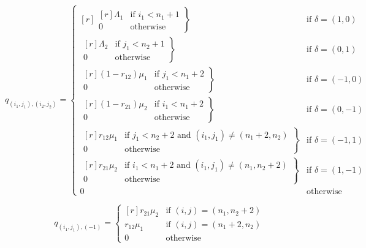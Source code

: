 \documentclass{article}
\begin{document}
\begin{equation}
  q_{(i_1, j_1),(i_2, j_2)} = \left\{
  \begin{matrix*}[ r ]
    \left. \begin{matrix*}[ r ]
      \Lambda_1 & \text{if } i_1 < n_1 + 1 \\
      0 & \text{otherwise}
    \end{matrix*} \right\} & \text{if } \delta = (1, 0) \\
    \left. \begin{matrix*}[ r ]
      \Lambda_2 & \text{if } j_1 < n_2 + 1 \\
      0 & \text{otherwise}
    \end{matrix*} \right\} & \text{if } \delta = (0, 1) \\
    \left. \begin{matrix*}[ r ]
      (1 - r_{12})\mu_1 & \text{if } j_1 < n_1 + 2 \\
      0 & \text{otherwise}
    \end{matrix*} \right\} & \text{if } \delta = (-1, 0) \\
    \left. \begin{matrix*}[ r ]
      (1 - r_{21})\mu_2 & \text{if } i_1 < n_1 + 2 \\
      0 & \text{otherwise}
    \end{matrix*} \right\} & \text{if } \delta = (0, -1) \\
    \left. \begin{matrix*}[ r ]
      r_{12}\mu_1 & \text{if } j_1 < n_2 + 2 \text{ and } (i_1, j_1) \neq (n_1 + 2, n_2) \\
      0 & \text{otherwise}
    \end{matrix*} \right\} & \text{if } \delta = (-1, 1) \\
    \left. \begin{matrix*}[ r ]
      r_{21}\mu_2 & \text{if } i_1 < n_1 + 2 \text{ and } (i_1, j_1) \neq (n_1, n_2 + 2) \\
      0 & \text{otherwise}
    \end{matrix*} \right\} & \text{if } \delta = (1, -1) \\
    0 & \text{otherwise}
  \end{matrix*} \right.
\end{equation}

\begin{equation}
  q_{(i_1, j_1), (-1)} = \left\{
  \begin{matrix*}[ r ]
    r_{21}\mu_2 & \text{if } (i, j) = (n_1, n_2 + 2) \\
    r_{12}\mu_1 & \text{if } (i, j) = (n_1 + 2, n_2) \\
    0 & \text{otherwise}
  \end{matrix*}
  \right.
\end{equation}
\end{document}
